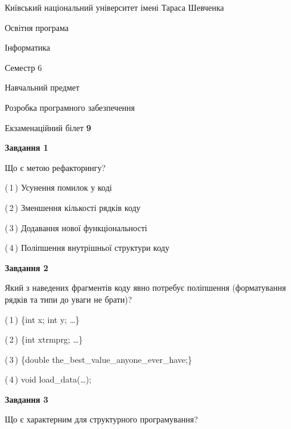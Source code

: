 \documentclass[10pt, ukrainian]{article}
\begin{document}
{{\begin {small}\par
{ \center  Київський національний університет імені Тараса Шевченка \par}
{\parbox {5 cm}{Освітня програма \hfill}{\parbox {7 cm}{Інформатика \hfill}}\parbox {6 cm}{\hfill Семестр 6}}\par
{\parbox {5 cm} {Навчальний предмет \hfill}\parbox {7 cm}{Розробка програмного забезпечення \hfill}\parbox {6cm}{\hfill}\par}\vspace{-7pt} \end{small}}{\center Екзаменаційний білет \No \textbf
{ 9 }\par}}
{
\begin {large}
{\begin {center}\textbf{Завдання 1}\end {center}}\par
Що є метою рефакторингу?\par
\vspace{2mm}



(\,1\,) Усунення помилок у коді%



(\,2\,) Зменшення кількості рядків коду%



(\,3\,) Додавання нової функціональності%



(\,4\,) Поліпшення внутрішньої структури коду%


{\begin {center}\textbf{Завдання 2}\end {center}}\par
Який з наведених фрагментів коду явно потребує поліпшення (форматування рядків та типи до уваги не брати)?\par
\vspace{2mm}



(\,1\,) \{int x; int y; …\}%



(\,2\,) \{int xtrmprg; …\}%



(\,3\,) \{double the\_best\_value\_anyone\_ever\_have;\} %



(\,4\,) void load\_data(…);%


{\begin {center}\textbf{Завдання 3}\end {center}}\par
Що є характерним для структурного програмування?\par
\vspace{2mm}




\end{large}}
\end{document}
